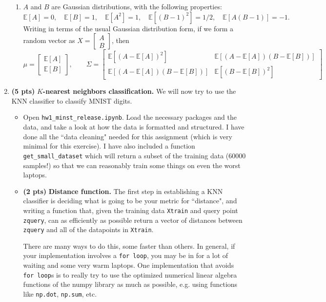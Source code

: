\documentclass{article}
\newcommand{\bE}{\mathbb E}
\newcommand{\showpoints}[1]{\textbf{(#1)}}
\begin{document}
\begin{enumerate}
\begin{enumerate}
\item $A$ and $B$ are Gaussian distributions, with   the following properties:
\[
\bE[A] = 0,\quad \bE[B] = 1, \quad\bE[A^2] = 1, \quad\bE[(B-1)^2] = 1/2, \quad\bE[A(B-1)] = -1.
\]
Writing in terms of the usual Gaussian distribution form, if we form a random vector as $X = \begin{bmatrix} A \\ B\end{bmatrix}$, then
\[
\mu = \begin{bmatrix} \bE[A]\\\bE[B]\end{bmatrix}, \qquad
\Sigma = \begin{bmatrix} \bE[(A-\bE[A])^2] & \bE[(A-\bE[A])(B-\bE[B])] \\\bE[(A-\bE[A])(B-\bE[B])] & \bE[(B-\bE[B])^2] \end{bmatrix} 
\]


\end{enumerate}






\item  \showpoints{5 pts}  \textbf{$K$-nearest neighbors classification.}  We will now try to use the KNN classifier to classify MNIST digits. 

\begin{itemize}
\item Open \texttt{hw1\_minst\_release.ipynb}. Load the necessary packages and the data, and take a look at how the data is formatted and structured. I have done all the ``data cleaning" needed for this assignment (which is very minimal for this exercise). I have also included a function \texttt{get\_small\_dataset} which will return a subset of the training data (60000 samples!) so that we can reasonably train some things on even the worst laptops. 

\item  \showpoints{2 pts}  \textbf{Distance function.} The first step in establishing a KNN classifier is deciding what is going to be your metric for ``distance", and writing a function that, given the training data \texttt{Xtrain} and query point \texttt{zquery}, can as efficiently as possible return a vector of distances between \texttt{zquery} and all of the datapoints in \texttt{Xtrain}. 

There are many ways to do this, some faster than others. In general, if your implementation involves a \texttt{for loop}, you may be in for a lot of waiting and some very warm laptops. One implementation that avoids \texttt{for loop}s is to really try to use the optimized numerical linear algebra functions of the numpy library as much as possible, e.g. using functions like \texttt{np.dot}, \texttt{np.sum}, etc. 


\end{itemize}
\end{enumerate}
\end{document}
